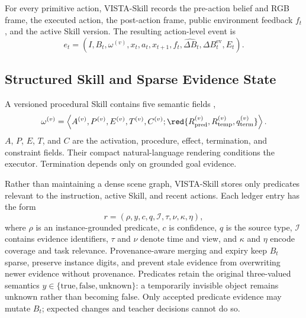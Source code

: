 For every primitive action, VISTA-Skill records the pre-action belief and RGB frame, the executed action, the post-action frame, public environment feedback $f_t$, and the active Skill version.  The resulting action-level event is
\begin{equation}
    e_t=\left(I,B_t,\omega^{(v)},x_t,a_t,x_{t+1},f_t,
    \widehat{\Delta B}_t,\Delta B_t^{\mathrm{ev}},E_t\right).
\end{equation}

\subsection{Structured Skill and Sparse Evidence State}

A versioned procedural Skill contains five semantic fields ,
\begin{equation}
    \omega^{(v)}=\left\langle
    A^{(v)},P^{(v)},E^{(v)},T^{(v)},C^{(v)};
    \red{R_{\mathrm{pred}}^{(v)},R_{\mathrm{temp}}^{(v)},q_{\mathrm{term}}^{(v)}}
    \right\rangle .
\end{equation}
$A$, $P$, $E$, $T$, and $C$ are the activation, procedure, effect, termination, and constraint fields. Their compact natural-language rendering conditions the executor.  Termination depends only on grounded goal evidence.

{\color{red}Rather than maintaining a dense scene graph, VISTA-Skill stores only predicates relevant to the instruction, active Skill, and recent actions. Each ledger entry has the form
\begin{equation}
    r=\left(\rho,y,c,q,\mathcal{I},\tau,\nu,\kappa,\eta\right),
\end{equation}
where $\rho$ is an instance-grounded predicate, $c$ is confidence, $q$ is the source type, $\mathcal{I}$ contains evidence identifiers, $\tau$ and $\nu$ denote time and view, and $\kappa$ and $\eta$ encode coverage and task relevance. Provenance-aware merging and expiry keep $B_t$ sparse, preserve instance digits, and prevent stale evidence from overwriting newer evidence without provenance.} Predicates retain the original three-valued semantics $y\in\{\mathrm{true},\mathrm{false},\mathrm{unknown}\}$: a temporarily invisible object remains unknown rather than becoming false. Only accepted predicate evidence may mutate $B_t$; expected changes and teacher decisions cannot do so.

